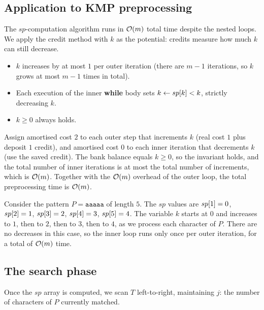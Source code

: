 \subsection{Application to KMP preprocessing}

\begin{formaldetails}
The $sp$-computation algorithm runs in $\mathcal{O}\!\left(m\right)$ total time despite the nested loops.
We apply the credit method with $k$ as the potential: credits measure how much $k$
can still decrease.

\begin{itemize}[nosep]
  \item $k$ increases by at most $1$ per outer iteration (there are $m-1$ iterations,
        so $k$ grows at most $m-1$ times in total).
  \item Each execution of the inner \textbf{while} body sets $k \gets sp\kern0pt[k] < k$,
        strictly decreasing $k$.
  \item $k \geq 0$ always holds.
\end{itemize}

Assign amortised cost $2$ to each outer step that increments $k$ (real cost $1$ plus
deposit $1$ credit), and amortised cost $0$ to each inner iteration that decrements $k$
(use the saved credit).  The bank balance equals $k \geq 0$, so the invariant holds,
and the total number of inner iterations is at most the total number of increments,
which is $\mathcal{O}\!\left(m\right)$.
Together with the $\mathcal{O}\!\left(m\right)$ overhead of the outer loop, the total preprocessing time is $\mathcal{O}\!\left(m\right)$.
\end{formaldetails}

\begin{example}
  Consider the pattern $P = \texttt{aaaaa}$ of length $5$. The $sp$ values are
  $sp\kern0pt[1] = 0$, $sp\kern0pt[2] = 1$, $sp\kern0pt[3] = 2$, $sp\kern0pt[4] = 3$, $sp\kern0pt[5] = 4$.
  The variable $k$ starts at $0$ and increases to $1$, then to $2$, then to $3$, then to $4$,
  as we process each character of $P$. There are no decreases in this case, so the inner loop
  runs only once per outer iteration, for a total of $\mathcal{O}\!\left(m\right)$ time.
\end{example}

\subsection{The search phase}

Once the $sp$ array is computed, we scan $T$ left-to-right, maintaining $j$: the number of
characters of $P$ currently matched.

